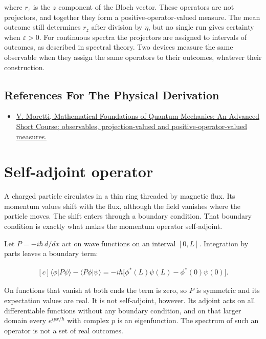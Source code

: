 \documentclass[11pt,oneside]{book}
\newenvironment{centeredalign}{\[\begin{gathered}[c]}{\end{gathered}\]}
\begin{document}
where \(r_z\) is the \(z\) component of the Bloch vector. These operators are not projectors, and together they form a positive-operator-valued measure. The mean outcome still determines \(r_z\) after division by \(\eta\), but no single run gives certainty when \(\varepsilon>0\). For continuous spectra the projectors are assigned to intervals of outcomes, as described in spectral theory. Two devices measure the same observable when they assign the same operators to their outcomes, whatever their construction.

\subsection*{References For The Physical Derivation}
\begin{itemize}
\item \href{https://arxiv.org/abs/1508.06951}{V. Moretti, Mathematical Foundations of Quantum Mechanics: An Advanced Short Course; observables, projection-valued and positive-operator-valued measures.}
\end{itemize}





\clearpage

\section{Self-adjoint operator}

\label{topic:self-adjoint-operator}

A charged particle circulates in a thin ring threaded by magnetic flux. Its momentum values shift with the flux, although the field vanishes where the particle moves. The shift enters through a boundary condition. That boundary condition is exactly what makes the momentum operator self-adjoint.

Let \(P=-i\hbar\,d/dx\) act on wave functions on an interval \([0,L]\). Integration by parts leaves a boundary term:

\begin{centeredalign}
\langle\phi|P\psi\rangle-\langle P\phi|\psi\rangle
=-i\hbar\bigl[\phi^*(L)\psi(L)-\phi^*(0)\psi(0)\bigr].
\end{centeredalign}

On functions that vanish at both ends the term is zero, so \(P\) is symmetric and its expectation values are real. It is not self-adjoint, however. Its adjoint acts on all differentiable functions without any boundary condition, and on that larger domain every \(e^{ipx/\hbar}\) with complex \(p\) is an eigenfunction. The spectrum of such an operator is not a set of real outcomes.
\end{document}
